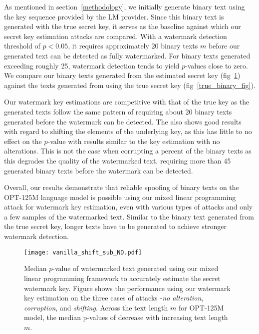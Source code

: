 As mentioned in section~\ref{methodology}, we initially generate binary text using the key sequence provided by the LM provider. Since this binary text is generated with the true secret key, it serves as the baseline against which our secret key estimation attacks are compared. With a watermark detection threshold of $p < 0.05$, it requires approximately 20 binary texts $m$  before our generated text can be detected as fully watermarked. For binary texts generated exceeding roughly 25, watermark detection tends to yield $p$-values close to zero. We compare our binary texts generated from the estimated secret key (fig~\ref{spoof_fig}) against the texts generated from using the true secret key (fig~\ref{true_binary_fig}). 

Our watermark key estimations are competitive with that of the true key as the generated texts follow the same pattern of requiring about 20 binary texts generated before the watermark can be detected. The  also shows good results with regard to shifting the elements of the underlying key, as this has little to no effect on the $p$-value with results similar to the key estimation with no alterations. This is not the case when corrupting a percent of the binary texts as this degrades the quality of the watermarked text, requiring more than 45 generated binary texts before the watermark can be detected. 

Overall, our results demonstrate that reliable spoofing of binary texts on the OPT-125M language model \cite{zhang2022opt} is possible using our mixed linear programming attack for watermark key estimation, even with various types of attacks and only a few samples of the watermarked text. Similar to the binary text generated from the true secret key, longer texts have to be generated to achieve stronger watermark detection.

\begin{figure}[h]
    \texttt{[image: vanilla\_shift\_sub\_ND.pdf]}
    \caption{Median $p$-value of watermarked text generated using our mixed linear programming framework to accurately estimate the secret watermark key. Figure shows the performance using our watermark key estimation  on the three cases of  attacks -\textit{no alteration}, \textit{corruption}, and \textit{shifting}. Across the text length $m$ for OPT-125M model, the median p-values of decrease  with increasing text length $m$.}
    \label{spoof_fig}
\end{figure}



